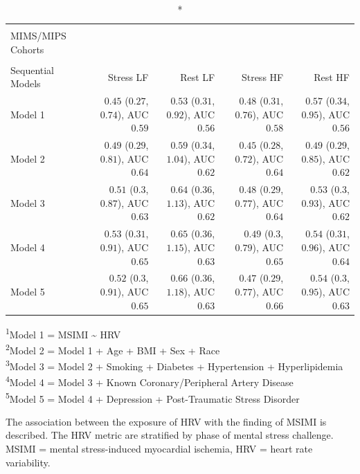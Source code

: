 \documentclass[
  11pt,
  openany]{book}
\begin{document}
\captionsetup[table]{labelformat=empty,skip=1pt}
\begin{longtable}{lrrrr}
\caption*{
\large Mental Stress-Induced Myocardial Ischemia and HRV\\ 
\small MIMS/MIPS Cohorts\\ 
} \\ 
\toprule
Sequential Models & Stress LF & Rest LF & Stress HF & Rest HF \\ 
\midrule
Model 1 & $0.45$ ($0.27$, $0.74$), AUC $0.59$ & $0.53$ ($0.31$, $0.92$), AUC $0.56$ & $0.48$ ($0.31$, $0.76$), AUC $0.58$ & $0.57$ ($0.34$, $0.95$), AUC $0.56$ \\ 
Model 2 & $0.49$ ($0.29$, $0.81$), AUC $0.64$ & $0.59$ ($0.34$, $1.04$), AUC $0.62$ & $0.45$ ($0.28$, $0.72$), AUC $0.64$ & $0.49$ ($0.29$, $0.85$), AUC $0.62$ \\ 
Model 3 & $0.51$ ($0.3$, $0.87$), AUC $0.63$ & $0.64$ ($0.36$, $1.13$), AUC $0.62$ & $0.48$ ($0.29$, $0.77$), AUC $0.64$ & $0.53$ ($0.3$, $0.93$), AUC $0.62$ \\ 
Model 4 & $0.53$ ($0.31$, $0.91$), AUC $0.65$ & $0.65$ ($0.36$, $1.15$), AUC $0.63$ & $0.49$ ($0.3$, $0.79$), AUC $0.65$ & $0.54$ ($0.31$, $0.96$), AUC $0.64$ \\ 
Model 5 & $0.52$ ($0.3$, $0.91$), AUC $0.65$ & $0.66$ ($0.36$, $1.18$), AUC $0.63$ & $0.47$ ($0.29$, $0.77$), AUC $0.66$ & $0.54$ ($0.3$, $0.95$), AUC $0.63$ \\ 
\bottomrule
\end{longtable}
\vspace{-5mm}
\begin{minipage}{\linewidth}
\textsuperscript{1}Model 1 = MSIMI \textasciitilde{} HRV \\ 
\textsuperscript{2}Model 2 = Model 1 + Age + BMI + Sex + Race \\ 
\textsuperscript{3}Model 3 = Model 2 + Smoking + Diabetes + Hypertension + Hyperlipidemia \\ 
\textsuperscript{4}Model 4 = Model 3 + Known Coronary/Peripheral Artery Disease \\ 
\textsuperscript{5}Model 5 = Model 4 + Depression + Post-Traumatic Stress Disorder \\ 
\end{minipage}
\begin{minipage}{\linewidth}
The association between the exposure of HRV with the finding of MSIMI is described. The HRV metric are stratified by phase of mental stress challenge. MSIMI = mental stress-induced myocardial ischemia, HRV = heart rate variability.\\ 
\end{minipage}
\end{document}
